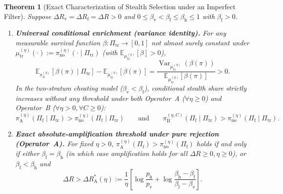 \documentclass[11pt,a4paper]{article}
\newtheorem{theorem}{Theorem}
\newcommand{\E}{\mathbb{E}}
\newcommand{\Var}{\operatorname{Var}}
\begin{document}
\begin{theorem}[Exact Characterization of Stealth Selection under an Imperfect Filter]\label{thm:selection}
Suppose $\Delta R_{\mathrm{v}} = \Delta R_{\mathrm{f}} = \Delta R > 0$ and $0 \le \beta_{\mathrm{v}} < \beta_{\mathrm{f}} \le \beta_{\mathrm{h}} \le 1$ with $\beta_{\mathrm{f}} > 0$.
\begin{enumerate}
  \item \textbf{Universal conditional enrichment (variance identity).} For any measurable survival function $\beta : \Pi_{\mathrm{tr}} \to [0, 1]$ not almost surely constant under $\mu_{\mathrm{tr}}^{(\eta)}(\cdot) := \pi_{\mathrm{no}}^{(\eta)}(\cdot \mid \Pi_{\mathrm{tr}})$ (with $\E_{\mu_{\mathrm{tr}}^{(\eta)}}[\beta] > 0$),
  \begin{equation}\label{eq:variance}
    \E_{\pi_{\mathrm{A}}^{(\eta)}}[\beta(\pi) \mid \Pi_{\mathrm{tr}}] - \E_{\mu_{\mathrm{tr}}^{(\eta)}}[\beta(\pi)]
    = \frac{\Var_{\mu_{\mathrm{tr}}^{(\eta)}}(\beta(\pi))}{\E_{\mu_{\mathrm{tr}}^{(\eta)}}[\beta(\pi)]} > 0.
  \end{equation}
  In the two-stratum cheating model ($\beta_{\mathrm{v}} < \beta_{\mathrm{f}}$), conditional stealth share strictly increases without any threshold under both Operator~A ($\forall \eta \ge 0$) and Operator~B ($\forall \eta > 0, \forall C \ge 0$):
  \begin{equation}
    \pi_{\mathrm{A}}^{(\eta)}(\Pi_{\mathrm{f}} \mid \Pi_{\mathrm{tr}}) > \pi_{\mathrm{no}}^{(\eta)}(\Pi_{\mathrm{f}} \mid \Pi_{\mathrm{tr}})
    \qquad \text{and} \qquad
    \pi_{\mathrm{B}}^{(\eta, C)}(\Pi_{\mathrm{f}} \mid \Pi_{\mathrm{tr}}) > \pi_{\mathrm{no}}^{(\eta)}(\Pi_{\mathrm{f}} \mid \Pi_{\mathrm{tr}}).
  \end{equation}

  \item \textbf{Exact absolute-amplification threshold under pure rejection (Operator~A).} For fixed $\eta > 0$, $\pi_{\mathrm{A}}^{(\eta)}(\Pi_{\mathrm{f}}) > \pi_{\mathrm{no}}^{(\eta)}(\Pi_{\mathrm{f}})$ holds if and only if either $\beta_{\mathrm{f}} = \beta_{\mathrm{h}}$ (in which case amplification holds for all $\Delta R \ge 0, \eta \ge 0$), or $\beta_{\mathrm{f}} < \beta_{\mathrm{h}}$ and
  \begin{equation}\label{eq:ampA}
    \Delta R > \Delta R_{\mathrm{A}}^*(\eta)
    := \frac{1}{\eta}\left[\log\frac{p_{\mathrm{h}}}{p_{\mathrm{v}}} + \log\frac{\beta_{\mathrm{h}} - \beta_{\mathrm{f}}}{\beta_{\mathrm{f}} - \beta_{\mathrm{v}}}\right].
  \end{equation}


\end{enumerate}
\end{theorem}
\end{document}
